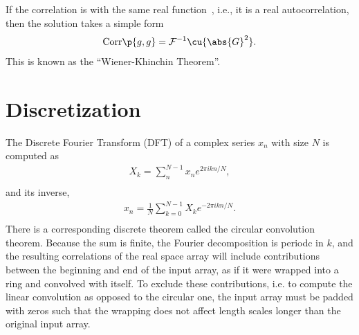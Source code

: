 \documentclass[11pt, a4paper]{article}
\begin{document}
If the correlation is with the same real function~\cite{Press1992}, i.e., it is a real autocorrelation,
then the solution takes a simple form
\begin{equation}\begin{aligned}
    \text{Corr}\p{g, g} = \mathcal{F}^{-1} \cu{\abs{G}^{2}}.
\end{aligned}\end{equation}
This is known as the ``Wiener-Khinchin Theorem''.

\section{Discretization}
The Discrete Fourier Transform (DFT) of a complex series $x_{n}$ with size $N$ is computed as
\begin{equation}\begin{aligned}
    X_{k} = \sum_{n}^{N-1} x_{n} e^{2 \pi i k n / N}, \\
\end{aligned}\end{equation}
and its inverse,
\begin{equation}\begin{aligned}
    x_{n} = \frac{1}{N}\sum_{k=0}^{N-1} X_{k} e^{-2 \pi i k n /N}. \\
\end{aligned}\end{equation}
There is a corresponding discrete theorem called the circular convolution theorem. Because the sum is
finite, the Fourier decomposition is periodc in $k$, and the resulting correlations of the real space
array will include contributions between the beginning and end of the input array, as if it were
wrapped into a ring and convolved with itself. To exclude these contributions, i.e. to compute the linear
convolution as opposed to the circular one, the input array must be padded with zeros such that the
wrapping does not affect length scales longer than the original input array.
\end{document}
